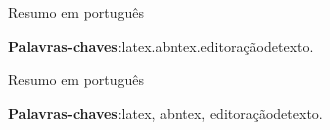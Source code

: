 \documentclass[pdftex,12pt,oneside,a4paper,english,french,spanish,brazil]{abntex2}
\begin{document}
      \begin{sloppypar}
          
            
            \frenchspacing
          
          \pretextual

            
            \cleardoublepage
          
            
            \cleardoublepage

            
            \cleardoublepage

            

            \begin{resumo}[RESUMO] 
                Resumo em português 
                
                \vspace{\onelineskip} 
                \noindent 
                
                
                \textbf{Palavras-chaves}:latex.abntex.editoraçãodetexto. 
            \end{resumo}

            \begin{resumo}[ABSTRACT] 
                Resumo em português 
                
                \vspace{\onelineskip} 
                \noindent 
                
                
                \textbf{Palavras-chaves}:latex, abntex, editoraçãodetexto. 
            \end{resumo}

            \renewcommand\contentsname{SUMÁRIO}


\end{sloppypar}
\end{document}
